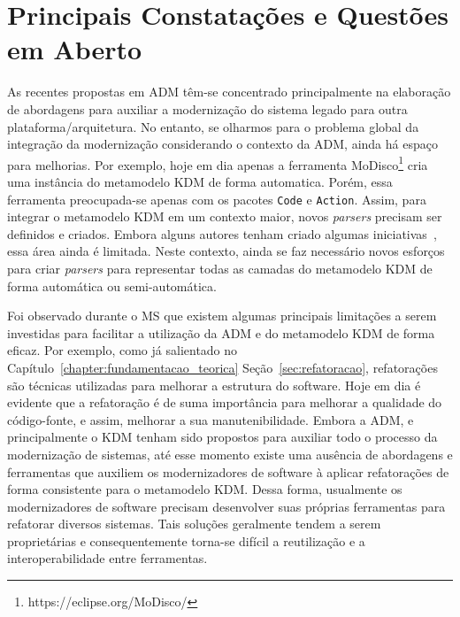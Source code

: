 \section{Principais Constatações e Questões em Aberto}

As recentes propostas em ADM têm-se concentrado principalmente na elaboração de abordagens para auxiliar a modernização do sistema legado para outra plataforma/arquitetura. No entanto, se olharmos para o problema global da integração da modernização considerando o contexto da ADM, ainda há espaço para melhorias. Por exemplo, hoje em dia apenas a ferramenta MoDisco\footnote{https://eclipse.org/MoDisco/} cria uma instância do metamodelo KDM de forma automatica. Porém, essa ferramenta preocupada-se apenas com os pacotes \texttt{Code} e \texttt{Action}. Assim, para integrar o metamodelo KDM em um contexto maior, novos \textit{parsers} precisam ser definidos e criados. Embora alguns autores tenham criado algumas iniciativas~\cite{5440163,Bruneliere_2010MODISCO}, essa área ainda é limitada. Neste contexto, ainda se faz necessário novos esforços para criar \textit{parsers} para representar todas as camadas do metamodelo KDM de forma automática ou semi-automática.

Foi observado durante o MS que existem algumas principais limitações a serem investidas para facilitar a utilização da ADM e do metamodelo KDM de forma eficaz. Por exemplo, como já salientado no Capítulo~\ref{chapter:fundamentacao_teorica} Seção~\ref{sec:refatoracao}, refatorações são técnicas utilizadas para melhorar a estrutura do software. Hoje em dia é evidente que a refatoração é de suma importância para melhorar a qualidade do código-fonte, e assim, melhorar a sua manutenibilidade.
Embora a ADM, e principalmente o KDM tenham sido propostos para auxiliar todo o processo da modernização de sistemas, até esse momento existe uma ausência de abordagens e ferramentas que auxiliem os modernizadores de software à aplicar refatorações de forma consistente para o metamodelo KDM. Dessa forma, usualmente os modernizadores de software precisam desenvolver suas próprias ferramentas para refatorar diversos sistemas. Tais soluções geralmente tendem a serem proprietárias e consequentemente torna-se difícil a reutilização e a interoperabilidade entre ferramentas.

